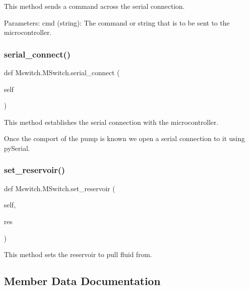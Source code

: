\begin{DoxyVerb}This method sends a command across the serial connection.

Parameters:
    cmd (string): The command or string that is to be sent to the microcontroller.
\end{DoxyVerb}
 \mbox{\label{class_mswitch_1_1_m_switch_a1ea0e8470eaf51e2971ebbc55632b394}} 
\subsubsection{\texorpdfstring{serial\_connect()}{serial\_connect()}}
{\footnotesize\ttfamily def Mswitch.\+M\+Switch.\+serial\+\_\+connect (\begin{DoxyParamCaption}\item[{}]{self }\end{DoxyParamCaption})}

\begin{DoxyVerb}This method establishes the serial connection with the microcontroller.

Once the comport of the pump is known we open a serial connection to it using pySerial.
\end{DoxyVerb}
 \mbox{\label{class_mswitch_1_1_m_switch_abc4ef313e6319d0d71197ffbed7be4c0}} 
\subsubsection{\texorpdfstring{set\_reservoir()}{set\_reservoir()}}
{\footnotesize\ttfamily def Mswitch.\+M\+Switch.\+set\+\_\+reservoir (\begin{DoxyParamCaption}\item[{}]{self,  }\item[{}]{res }\end{DoxyParamCaption})}

\begin{DoxyVerb}This method sets the reservoir to pull fluid from.
\end{DoxyVerb}
 

\subsection{Member Data Documentation}
\mbox{\label{class_mswitch_1_1_m_switch_a3b1ad086eaa3a9a2bae7ad859b002e89}} 
